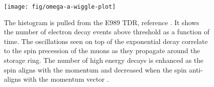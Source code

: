 \begin{figure}
\label{fig:omega-a-wiggle-plot}
\texttt{[image: fig/omega-a-wiggle-plot]}
\caption{The histogram is pulled from the E989 TDR, reference \cite{e989-tdr}.  It shows the number of electron decay events above threshold as a function of time.  The oscillations seen on top of the exponential decay correlate to the spin precession of the muons as they propagate around the storage ring.  The number of high energy decays is enhanced as the spin aligns with the momentum and decreased when the spin anti-aligns with the momentum vector .}
\end{figure}

